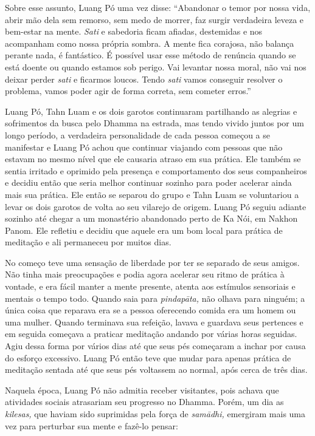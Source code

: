 Sobre esse assunto, Luang Pó uma vez disse: ``Abandonar o temor por
nossa vida, abrir mão dela sem remorso, sem medo de morrer, faz surgir
verdadeira leveza e bem-estar na mente. \emph{Sati} e sabedoria ficam
afiadas, destemidas e nos acompanham como nossa própria sombra. A mente
fica corajosa, não balança perante nada, é fantástico. É possível usar
esse método de renúncia quando se está doente ou quando estamos sob
perigo. Vai levantar nossa moral, não vai nos deixar perder \emph{sati}
e ficarmos loucos. Tendo \emph{sati} vamos conseguir resolver o
problema, vamos poder agir de forma correta, sem cometer erros.''

Luang Pó, Tahn Luam e os dois garotos continuaram partilhando as
alegrias e sofrimentos da busca pelo Dhamma na estrada, mas tendo vivido
juntos por um longo período, a verdadeira personalidade de cada pessoa
começou a se manifestar e Luang Pó achou que continuar viajando com
pessoas que não estavam no mesmo nível que ele causaria atraso em sua
prática. Ele também se sentia irritado e oprimido pela presença e
comportamento dos seus companheiros e decidiu então que seria melhor
continuar sozinho para poder acelerar ainda mais sua prática. Ele então
se separou do grupo e Tahn Luam se voluntariou a levar os dois garotos
de volta ao seu vilarejo de origem. Luang Pó seguiu adiante sozinho até
chegar a um monastério abandonado perto de Ka Nói, em Nakhon Panom. Ele
refletiu e decidiu que aquele era um bom local para prática de meditação
e ali permaneceu por muitos dias.

No começo teve uma sensação de liberdade por ter se separado de seus
amigos. Não tinha mais preocupações e podia agora acelerar seu ritmo de
prática à vontade, e era fácil manter a mente presente, atenta aos
estímulos sensoriais e mentais o tempo todo. Quando saia para
\emph{pindapāta,} não olhava para ninguém; a única coisa que reparava
era se a pessoa oferecendo comida era um homem ou uma mulher. Quando
terminava sua refeição, lavava e guardava seus pertences e em seguida
começava a praticar meditação andando por várias horas seguidas. Agiu
dessa forma por vários dias até que seus pés começaram a inchar por
causa do esforço excessivo. Luang Pó então teve que mudar para apenas
prática de meditação sentada até que seus pés voltassem ao normal, após
cerca de três dias.

Naquela época, Luang Pó não admitia receber visitantes, pois achava que
atividades sociais atrasariam seu progresso no Dhamma. Porém, um dia as
\emph{kilesas,} que haviam sido suprimidas pela força de \emph{samādhi,}
emergiram mais uma vez para perturbar sua mente e fazê-lo pensar:

